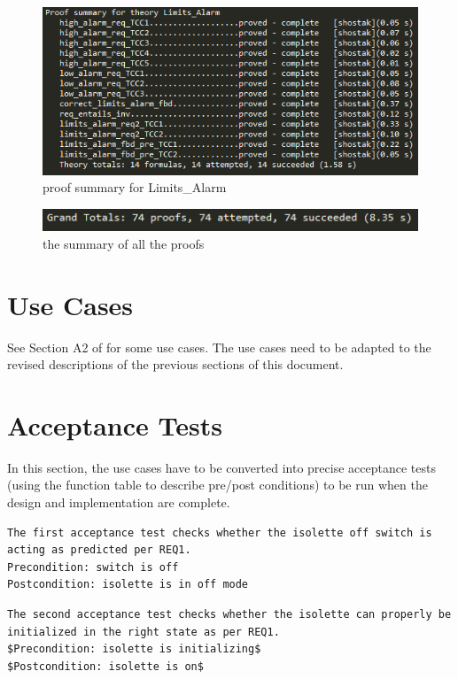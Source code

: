 \documentclass[fontsize=12pt,paper=letter,twoside]{scrartcl}
\begin{document}
\begin{figure}[!htb]
\begin{center}
\includegraphics[width=.8\textwidth]{pics/prf_Limits_Alarm.png}
\end{center}
\caption{proof summary for Limits\_Alarm}
\label{fig:LimitsAlarm}
\end{figure}

\begin{figure}[!htb]
\begin{center}
\includegraphics[width=.8\textwidth]{pics/prf_all.png}
\end{center}
\caption{the summary of all the proofs}
\label{fig:prfall}
\end{figure}

\section{Use Cases}
See Section A2 of \cite{REMH} for some use cases. The use cases need to be adapted to the revised descriptions of the previous sections of this document.

\section{Acceptance Tests}
In this section, the use cases have to be converted into precise acceptance tests (using the function table to describe pre/post conditions) to be run when the design and implementation are complete.


\begin{verbatim}
The first acceptance test checks whether the isolette off switch is acting as predicted per REQ1.
Precondition: switch is off
Postcondition: isolette is in off mode
\end{verbatim}

\begin{verbatim}
The second acceptance test checks whether the isolette can properly be initialized in the right state as per REQ1.
$Precondition: isolette is initializing$
$Postcondition: isolette is on$
\end{verbatim}
\end{document}
